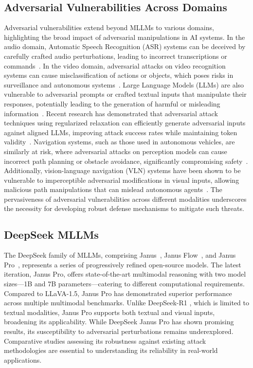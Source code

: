 \documentclass[runningheads]{llncs}
\begin{document}
\subsection{Adversarial Vulnerabilities Across Domains}
Adversarial vulnerabilities extend beyond MLLMs to various domains, highlighting the broad impact of adversarial manipulations in AI systems. In the audio domain, Automatic Speech Recognition (ASR) systems can be deceived by carefully crafted audio perturbations, leading to incorrect transcriptions or commands~\cite{carlini2018audioadversarialexamplestargeted}. In the video domain, adversarial attacks on video recognition systems can cause misclassification of actions or objects, which poses risks in surveillance and autonomous systems~\cite{jiang2019blackboxadversarialattacksvideo}. Large Language Models (LLMs) are also vulnerable to adversarial prompts or crafted textual inputs that manipulate their responses, potentially leading to the generation of harmful or misleading information~\cite{zou2023universaltransferableadversarialattacks}. Recent research has demonstrated that adversarial attack techniques using regularized relaxation can efficiently generate adversarial inputs against aligned LLMs, improving attack success rates while maintaining token validity~\cite{chacko2024adversarialattackslargelanguage}. Navigation systems, such as those used in autonomous vehicles, are similarly at risk, where adversarial attacks on perception models can cause incorrect path planning or obstacle avoidance, significantly compromising safety~\cite{mahima2021adversarial}. Additionally, vision-language navigation (VLN) systems have been shown to be vulnerable to imperceptible adversarial modifications in visual inputs, allowing malicious path manipulations that can mislead autonomous agents~\cite{islam2024maliciouspathmanipulationsexploitation}. The pervasiveness of adversarial vulnerabilities across different modalities underscores the necessity for developing robust defense mechanisms to mitigate such threats.


\subsection{DeepSeek MLLMs}
The DeepSeek family of MLLMs, comprising Janus~\cite{wu2024janus}, Janus Flow~\cite{ma2024janusflow}, and Janus Pro~\cite{chen2025janus}, represents a series of progressively refined open-source models. The latest iteration, Janus Pro, offers state-of-the-art multimodal reasoning with two model sizes—1B and 7B parameters—catering to different computational requirements. Compared to LLaVA-1.5, Janus Pro has demonstrated superior performance across multiple multimodal benchmarks. Unlike DeepSeek-R1 \cite{guo2025deepseek}, which is limited to textual modalities, Janus Pro supports both textual and visual inputs, broadening its applicability. While DeepSeek Janus Pro has shown promising results, its susceptibility to adversarial perturbations remains underexplored. Comparative studies assessing its robustness against existing attack methodologies are essential to understanding its reliability in real-world applications.
\end{document}
